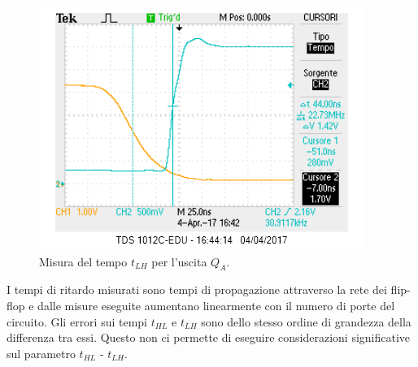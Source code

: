 \documentclass[10pt,a4paper]{article}
\begin{document}
\begin{figure}
\centering
\includegraphics[scale=1.0]{tplhQA.png}
\caption{Misura del tempo $t_{LH}$ per l'uscita $Q_A$.\label{qa2}}
\end{figure}



I tempi di ritardo misurati sono tempi di propagazione attraverso la rete dei flip-flop e dalle misure eseguite aumentano linearmente con il numero di porte del circuito. Gli errori sui tempi $t_{HL}$ e $t_{LH}$ sono dello stesso ordine di grandezza della differenza tra essi. Questo non ci permette di eseguire considerazioni significative sul parametro $t_{HL}$ - $t_{LH}$.\\
\end{document}
